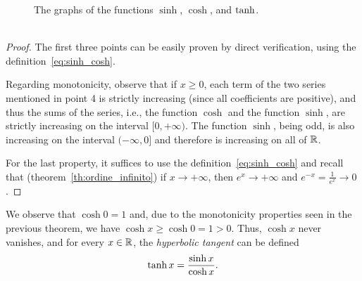\newsavebox{\qrfigiperb}%
\begin{figure}
  \centering%
  \caption{%
    The graphs of the functions $\sinh$, $\cosh$, and $\tgh$.
    \ifwidemargin\\\\\fi%
    \usebox{\qrfigiperb}%
  }
\end{figure}

\begin{proof}
The first three points can be easily proven by direct verification, using the
definition~\eqref{eq:sinh_cosh}.

Regarding monotonicity, observe that if $x\ge 0$, each term of the two series
mentioned in point 4 is strictly increasing (since all coefficients are
positive), and thus the sums of the series, i.e., the function $\cosh$ and the
function $\sinh$, are strictly increasing on the interval $[0,+\infty)$. The
function $\sinh$, being odd, is also increasing on the interval $(-\infty,0]$
and therefore is increasing on all of ${\mathbb R}$.

For the last property, it suffices to use the definition~\eqref{eq:sinh_cosh}
and recall that (theorem~\ref{th:ordine_infinito}) if $x\to +\infty$, then
$e^x\to +\infty$ and $e^{-x}=\frac{1}{e^{x}} \to 0$.
\end{proof}

We observe that $\cosh 0 = 1$ and, due to the monotonicity properties seen in
the previous theorem, we have $\cosh x \ge \cosh 0 = 1 > 0$. Thus, $\cosh x$
never vanishes, and for every $x\in {\mathbb R}$, the \emph{hyperbolic tangent} can be
defined
%
\mymargin{$\tgh$}%
\index{$\tgh$}%
\[
    \operatorname{tanh} x = \frac{\sinh x}{\cosh x}.
\]

